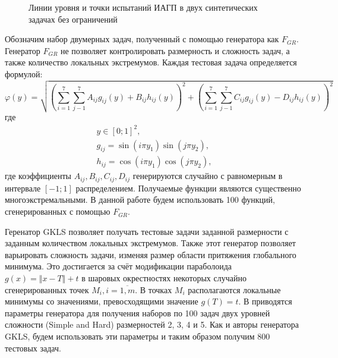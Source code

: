 \begin{figure}[ht]
  \centering
  \caption{Линии уровня и точки испытаний ИАГП в двух синтетических задачах без ограничений}
  \label{fig:isolines_unconstrained}
\end{figure}

Обозначим набор двумерных задач, полученный с помощью генератора \cite{grishaginClass}
как \(F_{GR}\). Генератор \(F_{GR}\) не позволяет контролировать размерность и сложность задач, а также количество локальных экстремумов.
Каждая тестовая задача определяется формулой:
\begin{displaymath}
  \varphi(y)=\sqrt{\left(\sum_{i=1}^7\sum_{j-1}^7 A_{ij}g_{ij}(y)+ B_{ij}h_{ij}(y)\right)^2+\left(\sum_{i=1}^7\sum_{j-1}^7 C_{ij}g_{ij}(y) - D_{ij}h_{ij}(y)\right)^2}
\end{displaymath}
где
\begin{displaymath}
  \begin{array}{cr}
    y\in[0;1]^2, \\
    g_{ij}=\sin(i\pi y_1)\sin(j\pi y_2), \\
    h_{ij}=\cos(i\pi y_1)\cos(j\pi y_2),
  \end{array}
\end{displaymath}
где коэффициенты \(A_{ij},B_{ij}, C_{ij}, D_{ij}\) генерируются случайно с равномерным в
интервале \([-1;1]\) распределением.
Получаемые функции являются существенно многоэкстремальными. В данной работе будем использовать 100 функций, сгенерированных с помощью \(F_{GR}\).

Геренатор GKLS \cite{Gaviano2003} позволяет получать тестовые задачи заданной размерности с заданным количеством локальных
экстремумов. Также этот генератор позволяет варьировать сложность задачи, изменяя размер области притяжения
глобального минимума. Это достигается за счёт модификации параболоида \(g(x)=\Vert x-T\Vert + t\) в
шаровых окрестностях некоторых случайно сгенерированных точек \(M_i, i=\overline{1,m}\). В точках
\(M_i\) располагаются локальные минимумы со значениями, превосходящими значение \(g(T)=t\).
В \cite{SergeyevKvasov2006} приводятся параметры генератора для получения
наборов по 100 задач двух уровней сложности (Simple and Hard) размерностей 2, 3, 4 и 5.
Как и авторы генератора GKLS, будем использовать эти параметры и таким образом получим 800 тестовых задач.

